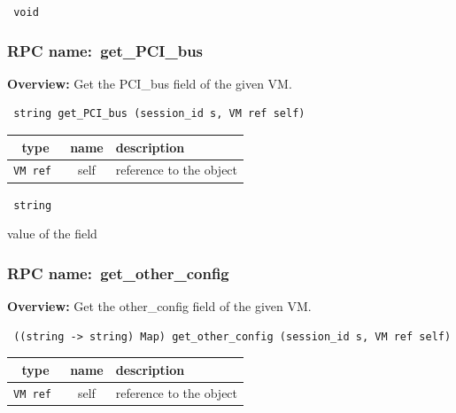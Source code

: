 \vspace{0.3cm}

{\tt 
void
}



\vspace{0.3cm}
\vspace{0.3cm}
\vspace{0.3cm}
\subsubsection{RPC name:~get\_PCI\_bus}

{\bf Overview:} 
Get the PCI\_bus field of the given VM.

\begin{verbatim} string get_PCI_bus (session_id s, VM ref self)\end{verbatim}



 
\vspace{0.3cm}
\begin{tabular}{|c|c|p{7cm}|}
 \hline
{\bf type} & {\bf name} & {\bf description} \\ \hline
{\tt VM ref } & self & reference to the object \\ \hline 

\end{tabular}

\vspace{0.3cm}

{\tt 
string
}


value of the field
\vspace{0.3cm}
\vspace{0.3cm}
\vspace{0.3cm}
\subsubsection{RPC name:~get\_other\_config}

{\bf Overview:} 
Get the other\_config field of the given VM.

\begin{verbatim} ((string -> string) Map) get_other_config (session_id s, VM ref self)\end{verbatim}



 
\vspace{0.3cm}
\begin{tabular}{|c|c|p{7cm}|}
 \hline
{\bf type} & {\bf name} & {\bf description} \\ \hline
{\tt VM ref } & self & reference to the object \\ \hline 

\end{tabular}


